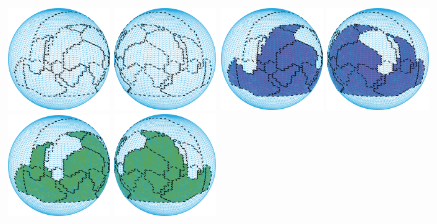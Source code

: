 \documentclass[Afour,sageh,times]{sagej}
\begin{document}
\begin{figure}[t]
\centering
\includegraphics[width = 0.24\textwidth]{figures/real_world/init_graph_left}
\includegraphics[width = 0.24\textwidth]{figures/real_world/init_graph_right}
\includegraphics[width = 0.24\textwidth]{figures/real_world/color_1_left}
\includegraphics[width = 0.24\textwidth]{figures/real_world/color_1_right}
\includegraphics[width = 0.24\textwidth]{figures/real_world/color_2_left}
\includegraphics[width = 0.24\textwidth]{figures/real_world/color_2_right}

\end{figure}
\end{document}
